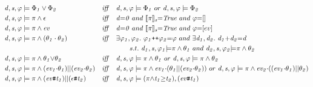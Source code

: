 \documentclass[acmsmall,10pt,review]{acmart}
\newcommand{\es}{\theta}
\newcommand{\ev}{ev}
\newcommand{\effect}{{\ensuremath{\mathrm{\Phi}}}}
\newcommand{\code}[1]{{\tt{\ensuremath{\m{#1}}}}}
\newcommand{\empt}{\textcolor{black}{\ensuremath{\epsilon}}}
\newcommand{\m}{\mathit}
\newcommand{\lappend}{\mathrel{\texttt{++}}}
\newcommand{\mysharp}{{\mathrel{\texttt{\#}}}}
\begin{document}
{\begin{figure}[]
  \vspace{-1mm}
  \renewcommand{\arraystretch}{1.2}
\small\begin{align*}
&\code{d, s, \varphi \models \effect_1 \vee \effect_2}  
&\m{iff}\quad & \code{d, s, \varphi \models \effect_1 } \ 
or\ \code{d, s, \varphi \models \effect_2 }  \\
&\code{d, s,  \varphi \models {\pi} \wedge \empt}  
&\m{iff}\quad & \code{d{=}0}\ and  \ \code{\llbracket {\pi} \rrbracket_s {=}  
{True} } \ and\  \code{ \varphi {=} [] }\\
&\code{d, s, \varphi \models {\pi} \wedge \ev }  
&\m{iff}\quad & \code{d{=}0}\ and  \ \code{\llbracket {\pi} \rrbracket_s {=}  
{True} }\ and \ \varphi {=} [\ev]  \\
&\code{d, s, \varphi \models {\pi} \wedge (\es_1\cdot \es_2)}  
&\m{iff}\quad & \exists \code{\varphi_1,\varphi_2}. \  
\code{ \varphi_1 {\lappend} \varphi_2 {=} \varphi}\ and\ 
\exists \code{d_1,d_2}. \  
\code{ d_1 {+} d_2 {=} d} \\
&&& \qquad  s.t. \ \code{d_1, s, \varphi_1 {\models} {\pi}  \wedge \es_1 }
\ and \ \code{d_2, s, \varphi_2 {\models} {\pi}  \wedge \es_2 }\\
&\code{d, s, \varphi \models {\pi} \wedge \es_1{\vee}\es_2}  
&\m{iff}\quad & 
\code{d, s, \varphi \models {\pi}  \wedge \es_1 } 
\ or\  
\code{d, s, \varphi \models {\pi}  \wedge \es_2 } \\
&\code{d, s, \varphi \models {\pi} \wedge (\ev_1{\cdot}\es_1)||(\ev_2{\cdot}\es_2)}  
&\m{iff}\quad & \code{d, s, \varphi \models {\pi}  \wedge \ev_1{\cdot} (\es_1||(\ev_2{\cdot}\es_2)) } 
\ or\ \code{d, s, \varphi \models {\pi}  \wedge \ev_2{\cdot}((\ev_1{\cdot}\es_1)||\es_2)  } \\
&\code{d, s, \varphi \models {\pi} \wedge (\ev\mysharp t_1) || (\epsilon \mysharp  t_2)}  
&\m{iff}\quad & \code{d, s, \varphi \models {(\pi{\wedge}t_1 {\geq}t_2)}, (\ev\mysharp t_1) } 

\end{align*}
\end{figure}}
\end{document}
